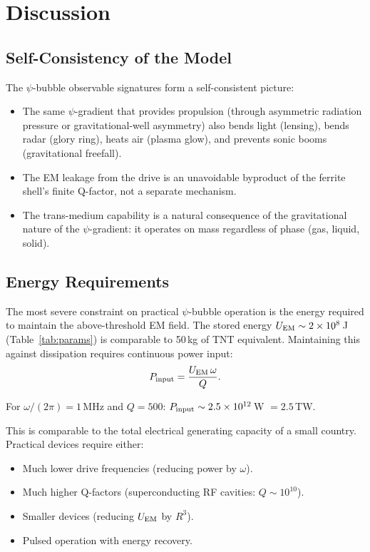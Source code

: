 \documentclass[11pt]{article}
\begin{document}
\section{Discussion}\label{sec:discussion}

\subsection{Self-Consistency of the Model}

The $\psi$-bubble observable signatures form a self-consistent picture:

\begin{itemize}
\item The same $\psi$-gradient that provides propulsion (through asymmetric
  radiation pressure or gravitational-well asymmetry) also bends light
  (lensing), bends radar (glory ring), heats air (plasma glow), and
  prevents sonic booms (gravitational freefall).

\item The EM leakage from the drive is an unavoidable byproduct of the
  ferrite shell's finite Q-factor, not a separate mechanism.

\item The trans-medium capability is a natural consequence of the
  gravitational nature of the $\psi$-gradient: it operates on mass
  regardless of phase (gas, liquid, solid).
\end{itemize}

\subsection{Energy Requirements}

The most severe constraint on practical $\psi$-bubble operation is the
energy required to maintain the above-threshold EM field. The stored
energy $U_{\rm EM} \sim 2 \times 10^8$\,J (Table~\ref{tab:params}) is
comparable to 50\,kg of TNT equivalent. Maintaining this against
dissipation requires continuous power input:
\begin{equation}
P_{\rm input} = \frac{U_{\rm EM}\,\omega}{Q}.
\end{equation}

For $\omega/(2\pi) = 1$\,MHz and $Q = 500$:
$P_{\rm input} \sim 2.5 \times 10^{12}$\,W $= 2.5$\,TW.

This is comparable to the total electrical generating capacity of
a small country. Practical devices require either:
\begin{itemize}[noitemsep]
\item Much lower drive frequencies (reducing power by $\omega$).
\item Much higher Q-factors (superconducting RF cavities: $Q \sim 10^{10}$).
\item Smaller devices (reducing $U_{\rm EM}$ by $R^3$).
\item Pulsed operation with energy recovery.
\end{itemize}
\end{document}
